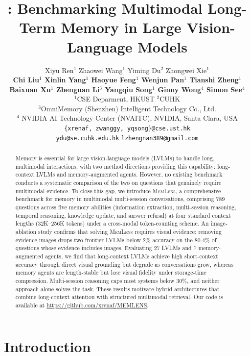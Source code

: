 \documentclass{article}
\title{\bench{}: Benchmarking Multimodal Long-Term Memory in Large Vision-Language Models}
\author{%
  Xiyu Ren$^{1}$ \quad
  Zhaowei Wang$^{1}$ \quad
  Yiming Du$^{2}$ \quad
  Zhongwei Xie$^{1}$ \\
  \textbf{
  Chi Liu$^{1}$ \quad
  Xinlin Yang$^{1}$ \quad
  Haoyue Feng$^{1}$ \quad
  Wenjun Pan$^{1}$ \quad
  Tianshi Zheng$^{1}$} \\
  \textbf{Baixuan Xu$^{1}$ \quad
  Zhengnan Li$^{3}$ \quad
  Yangqiu Song$^{1}$ \quad
  Ginny Wong$^{4}$ \quad
  Simon See$^{4}$} \\[6pt]
  $^{1}$CSE Deparment, HKUST \quad $^{2}$CUHK \\
  $^{3}$OmniMemory (Shenzhen) Intelligent Technology Co., Ltd. \\
  $^{4}$ NVIDIA AI Technology Center (NVAITC), NVIDIA, Santa Clara, USA \\[4pt]
  \texttt{\{xrenaf, zwanggy, yqsong\}@cse.ust.hk} \\
  \texttt{ydu@se.cuhk.edu.hk} \quad \texttt{lzhengnan389@gmail.com}
}
\newcommand{\bench}{\textsc{MemLens}}
\begin{document}
\maketitle

\begin{abstract}
Memory is essential for large vision-language models (LVLMs) to handle long, multimodal interactions, with two method directions providing this capability: long-context LVLMs and memory-augmented agents. However, no existing benchmark conducts a systematic comparison of the two on questions that genuinely require multimodal evidence. To close this gap, we introduce \bench{}, a comprehensive benchmark for memory in multimodal multi-session conversations, comprising 789 questions across five memory abilities (information extraction, multi-session reasoning, temporal reasoning, knowledge update, and answer refusal) at four standard context lengths (32K--256K tokens) under a cross-modal token-counting scheme. An image-ablation study confirms that solving \bench{} requires visual evidence: removing evidence images drops two frontier LVLMs below 2\% accuracy on the 80.4\% of questions whose evidence includes images. Evaluating 27 LVLMs and 7 memory-augmented agents, we find that long-context LVLMs achieve high short-context accuracy through direct visual grounding but degrade as conversations grow, whereas memory agents are length-stable but lose visual fidelity under storage-time compression. Multi-session reasoning caps most systems below 30\%, and neither approach alone solves the task. These results motivate hybrid architectures that combine long-context attention with structured multimodal retrieval. Our code is available at \url{https://github.com/xrenaf/MEMLENS}.
\end{abstract}

\section{Introduction}
\label{sec:intro}
\end{document}

